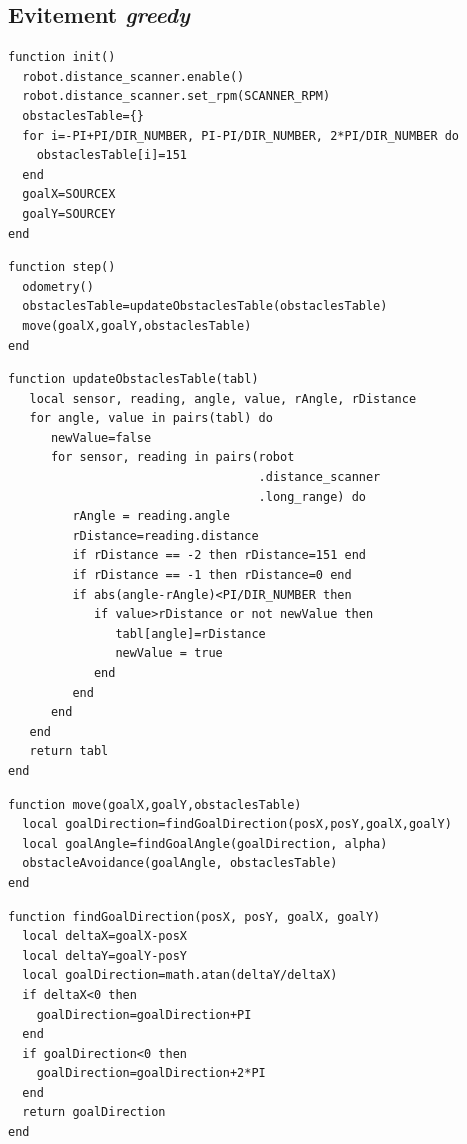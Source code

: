 \begin{subappendices}
  \subsection{Evitement \emph{greedy}\label{app:implEvitGreedy}}
  \begin{lstlisting}[caption=Initialisation]
function init()
  robot.distance_scanner.enable()
  robot.distance_scanner.set_rpm(SCANNER_RPM)
  obstaclesTable={}
  for i=-PI+PI/DIR_NUMBER, PI-PI/DIR_NUMBER, 2*PI/DIR_NUMBER do
    obstaclesTable[i]=151
  end
  goalX=SOURCEX
  goalY=SOURCEY
end
  \end{lstlisting}
  \begin{lstlisting}[caption=Structure générale]
function step()
  odometry()
  obstaclesTable=updateObstaclesTable(obstaclesTable)
  move(goalX,goalY,obstaclesTable)
end
  \end{lstlisting}
  \begin{lstlisting}[caption=Rafraîchir la table des mesures à chaque pas]
function updateObstaclesTable(tabl)
   local sensor, reading, angle, value, rAngle, rDistance
   for angle, value in pairs(tabl) do
      newValue=false
      for sensor, reading in pairs(robot
                                   .distance_scanner
                                   .long_range) do
         rAngle = reading.angle
         rDistance=reading.distance
         if rDistance == -2 then rDistance=151 end
         if rDistance == -1 then rDistance=0 end
         if abs(angle-rAngle)<PI/DIR_NUMBER then
            if value>rDistance or not newValue then
               tabl[angle]=rDistance
               newValue = true
            end
         end
      end
   end
   return tabl
end
  \end{lstlisting}
  \begin{lstlisting}[caption=Fonction move]
function move(goalX,goalY,obstaclesTable)
  local goalDirection=findGoalDirection(posX,posY,goalX,goalY)
  local goalAngle=findGoalAngle(goalDirection, alpha)
  obstacleAvoidance(goalAngle, obstaclesTable)
end
  \end{lstlisting}
  \begin{lstlisting}[caption=Trouver la direction du goal vu du footbot]
function findGoalDirection(posX, posY, goalX, goalY)
  local deltaX=goalX-posX
  local deltaY=goalY-posY
  local goalDirection=math.atan(deltaY/deltaX)
  if deltaX<0 then
    goalDirection=goalDirection+PI
  end
  if goalDirection<0 then
    goalDirection=goalDirection+2*PI
  end
  return goalDirection
end


\end{lstlisting}
\end{subappendices}
